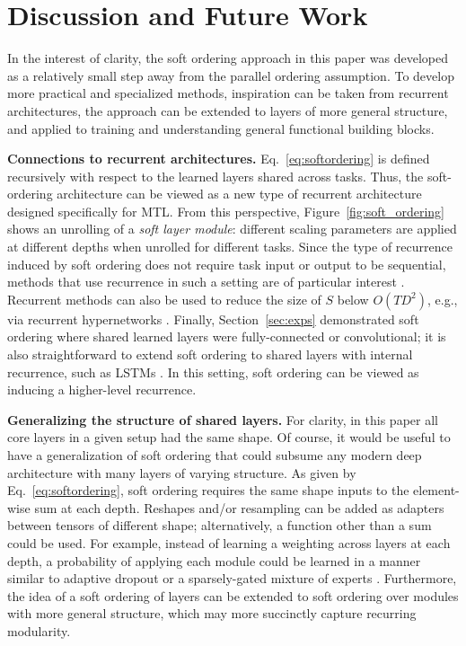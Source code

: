 \documentclass{article}
\theoremstyle{definition}
\theoremstyle{remark}
\begin{document}
\section{Discussion and Future Work} \label{sec:discussion}

In the interest of clarity, the soft ordering approach in this paper was developed as a relatively small step away from the parallel ordering assumption. To develop more practical and specialized methods, inspiration can be taken from recurrent architectures, the approach can be extended to layers of more general structure, and applied to training and understanding general functional building blocks.

\textbf{Connections to recurrent architectures.}
Eq.~\ref{eq:softordering} is defined recursively with respect to the learned layers shared across tasks. Thus, the soft-ordering architecture can be viewed as a new type of recurrent architecture designed specifically for MTL.
From this perspective, Figure~\ref{fig:soft_ordering} shows an unrolling of a \emph{soft layer module}: different scaling parameters are applied at different depths when unrolled for different tasks.
Since the type of recurrence induced by soft ordering does not require task input or output to be sequential, methods that use recurrence in such a setting are of particular interest \citep{Liang:2015,Liao:2016,Pinheiro:2014,Socher:2011,Zamir:2016}.
Recurrent methods can also be used to reduce the size of $S$ below $O(TD^2)$, e.g., via recurrent hypernetworks \citep{Ha:2016}.
Finally, Section~\ref{sec:exps} demonstrated soft ordering where shared learned layers were fully-connected or convolutional;
it is also straightforward to extend soft ordering to shared layers with internal recurrence, such as LSTMs \citep{Hochreiter:1997}. In this setting, soft ordering can be viewed as inducing a higher-level recurrence.

\textbf{Generalizing the structure of shared layers.}
For clarity, in this paper all core layers in a given setup had the same shape. 
Of course, it would be useful to have a generalization of soft ordering that could subsume any modern deep architecture with many layers of varying structure.
As given by Eq.~\ref{eq:softordering}, soft ordering requires the same shape inputs to the element-wise sum at each depth.
Reshapes and/or resampling can be added as adapters between tensors of different shape; alternatively, a function other than a sum could be used.
For example, instead of learning a weighting across layers at each depth, a probability of applying each module could be learned in a manner similar to adaptive dropout \citep{Ba:2013,Li:2016} or a sparsely-gated mixture of experts \citep{Shazeer:2017}.
Furthermore, the idea of a soft ordering of layers can be extended to soft ordering over modules with more general structure, which may more succinctly capture recurring modularity.
\end{document}
